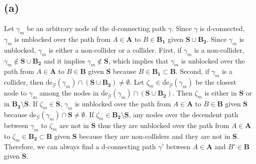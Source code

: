 \documentclass[10pt]{article}
\begin{document}
\subsection{(a)}
Let $\gamma_m$ be an arbitrary node of the d-connecting path $\gamma$. Since $\gamma$ is d-connected, $\gamma_m$ is unblocked over the path from $A \in \mathbf{A}$ to $B \in \mathbf{B_1}$ given $\mathbf{S} \cup \mathbf{B_2}$. Since $\gamma_m$ is unblocked, $\gamma_m$ is either a non-collider or a collider. 
First, if $\gamma_m$ is a non-collider, $\gamma_m \notin \mathbf{S} \cup \mathbf{B_2}$ and it implies $\gamma_m \notin \mathbf{S}$, which implies that $\gamma_m$ is unblocked over the path from $A \in \mathbf{A}$ to $B \in \mathbf{B}$ given $\mathbf{S}$ because $B \in \mathbf{B_1} \subset \mathbf{B}$.
Second, if $\gamma_m$ is a collider, 
then $\overline{\text{de}}_\mathcal{G}(\gamma_m) \cap \left(\mathbf{S} \cup \mathbf{B_2}\right)\neq\emptyset$. 
Let $\zeta_m \in \overline{\text{de}}_\mathcal{G}(\gamma_m)$ be the closest node to $\gamma_m$ among the nodes in $\overline{\text{de}}_\mathcal{G}(\gamma_m) \cap \left(\mathbf{S} \cup \mathbf{B_2}\right)$. 
Then $\zeta_m$ is either in $\mathbf{S}$ or in $\mathbf{B_2}\setminus \mathbf{S}$.
If $\zeta_m \in \mathbf{S}$, $\gamma_m$ is unblocked over the path from $A \in \mathbf{A}$ to $B \in \mathbf{B}$ given $\mathbf{S}$ because $\overline{\text{de}}_\mathcal{G}(\gamma_m) \cap \mathbf{S}\neq\emptyset$.
If $\zeta_m \in \mathbf{B_2\setminus S}$, any nodes over the decendent path between $\gamma_m$ to $\zeta_m$ are not in $\mathbf{S}$ thus they are unblocked over the path from $A \in \mathbf{A}$ to $\zeta_m \in \mathbf{B_2} \subset \mathbf{B}$ given $\mathbf{S}$ because they are non-colliders and they are not in $\mathbf{S}$.
Therefore, we can always find a d-connecting path $\gamma'$ between $A \in \mathbf{A}$ and $B' \in \mathbf{B}$ given $\mathbf{S}$.
\end{document}
